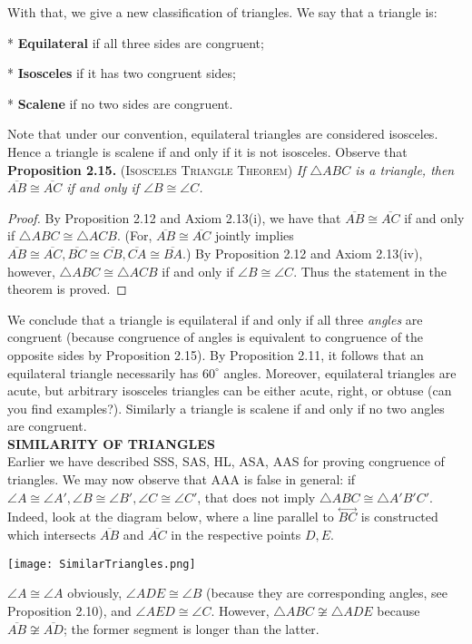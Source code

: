 \documentclass[leqno]{book}
\begin{document}
\noindent With that, we give a new classification of triangles.  We say that a triangle is:

* \textbf{Equilateral} if all three sides are congruent;

* \textbf{Isosceles} if it has two congruent sides;

* \textbf{Scalene} if no two sides are congruent.

Note that under our convention, equilateral triangles are considered isosceles.  Hence a triangle is scalene if and only if it is not isosceles.  Observe that\\

\noindent\textbf{Proposition 2.15.} \textsc{(Isosceles Triangle Theorem)} \emph{If $\triangle ABC$ is a triangle, then $\overline{AB}\cong\overline{AC}$ if and only if $\angle B\cong\angle C$.}
\begin{proof}
By Proposition 2.12 and Axiom 2.13(i), we have that $\overline{AB}\cong\overline{AC}$ if and only if $\triangle ABC\cong\triangle ACB$.  (For, $\overline{AB}\cong\overline{AC}$ jointly implies $\overline{AB}\cong\overline{AC},\overline{BC}\cong\overline{CB},\overline{CA}\cong\overline{BA}$.)  By Proposition 2.12 and Axiom 2.13(iv), however, $\triangle ABC\cong\triangle ACB$ if and only if $\angle B\cong\angle C$.  Thus the statement in the theorem is proved.
\end{proof}

\noindent We conclude that a triangle is equilateral if and only if all three \emph{angles} are congruent (because congruence of angles is equivalent to congruence of the opposite sides by Proposition 2.15).  By Proposition 2.11, it follows that an equilateral triangle necessarily has $60^\circ$ angles.  Moreover, equilateral triangles are acute, but arbitrary isosceles triangles can be either acute, right, or obtuse (can you find examples?).  Similarly a triangle is scalene if and only if no two angles are congruent.\\

\noindent\textbf{SIMILARITY OF TRIANGLES}\\

\noindent Earlier we have described SSS, SAS, HL, ASA, AAS for proving congruence of triangles.  We may now observe that AAA is false in general: if $\angle A\cong\angle A',\angle B\cong\angle B',\angle C\cong\angle C'$, that does not imply $\triangle ABC\cong\triangle A'B'C'$.  Indeed, look at the diagram below, where a line parallel to $\overset{\longleftrightarrow}{BC}$ is constructed which intersects $\overline{AB}$ and $\overline{AC}$ in the respective points $D,E$.
\begin{center}\texttt{[image: SimilarTriangles.png]}\end{center}
$\angle A\cong\angle A$ obviously, $\angle ADE\cong\angle B$ (because they are corresponding angles, see Proposition 2.10), and $\angle AED\cong\angle C$.  However, $\triangle ABC\not\cong\triangle ADE$ because $\overline{AB}\not\cong\overline{AD}$; the former segment is longer than the latter.
\end{document}
